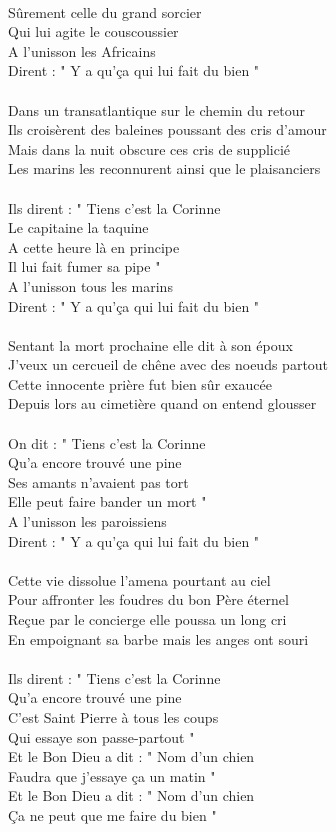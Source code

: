 \\Sûrement celle du grand sorcier
\\Qui lui agite le couscoussier
\\A l'unisson les Africains
\\Dirent : " Y a qu'ça qui lui fait du bien "
\\\\Dans un transatlantique sur le chemin du retour
\\Ils croisèrent des baleines poussant des cris d'amour
\\Mais dans la nuit obscure ces cris de supplicié
\\Les marins les reconnurent ainsi que le plaisanciers
\\\\Ils dirent : " Tiens c'est la Corinne
\\Le capitaine la taquine
\\A cette heure là en principe
\\Il lui fait fumer sa pipe "
\\A l'unisson tous les marins
\\Dirent : " Y a qu'ça qui lui fait du bien "
\\\\Sentant la mort prochaine elle dit à son époux
\\J'veux un cercueil de chêne avec des noeuds partout
\\Cette innocente prière fut bien sûr exaucée
\\Depuis lors au cimetière quand on entend glousser
\\\\On dit : " Tiens c'est la Corinne
\\Qu'a encore trouvé une pine
\\Ses amants n'avaient pas tort
\\Elle peut faire bander un mort "
\\A l'unisson les paroissiens
\\Dirent : " Y a qu'ça qui lui fait du bien "
\\\\Cette vie dissolue l'amena pourtant au ciel
\\Pour affronter les foudres du bon Père éternel
\\Reçue par le concierge elle poussa un long cri
\\En empoignant sa barbe mais les anges ont souri
\\\\Ils dirent : " Tiens c'est la Corinne
\\Qu'a encore trouvé une pine
\\C'est Saint Pierre à tous les coups
\\Qui essaye son passe-partout "
\\Et le Bon Dieu a dit : " Nom d'un chien
\\Faudra que j'essaye ça un matin "
\\Et le Bon Dieu a dit : " Nom d'un chien
\\Ça ne peut que me faire du bien "

\breakpage